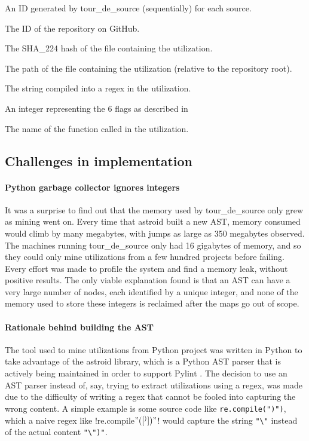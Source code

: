 \begin{description} \itemsep -1pt
\item[uniqueSourceID] An ID generated by tour\_de\_source (sequentially) for each source.
\item[repoID] The ID of the repository on GitHub.
\item[sourceJSON] 
\item[fileHash] The SHA\_224 hash of the file containing the utilization.
\item[filePath] The path of the file containing the utilization (relative to the repository root).
\item[pattern] The string compiled into a regex in the utilization.
\item[flags] An integer representing the 6 flags as described in 
\item[regexFunction] The name of the function called in the utilization.
\end{description}

\subsection{Challenges in implementation}
\label{sec:miningChallenges}

\paragraph{Python garbage collector ignores integers}  It was a surprise to find out that the memory used by tour\_de\_source only grew as mining went on.  Every time that astroid built a new AST, memory consumed would climb by many megabytes, with jumps as large as 350 megabytes observed.  The machines running tour\_de\_source only had 16 gigabytes of memory, and so they could only mine utilizations from a few hundred projects before failing.  Every effort was made to profile the system and find a memory leak, without positive results.  The only viable explanation found is that an AST can have a very large number of nodes, each identified by a unique integer, and none of the memory used to store these integers is reclaimed after the maps go out of scope.

\paragraph{Rationale behind building the AST} The tool used to mine utilizations from Python project was written in Python to take advantage of the astroid  library, which is a Python AST parser that is actively being maintained in order to support Pylint .  The decision to use an AST parser instead of, say, trying to extract utilizations using a regex, was made due to the difficulty of writing a regex that cannot be fooled into capturing the wrong content.  A simple example is some source code like {\tt re.compile("\")")}, which a naive regex like \cverb!re.compile\("([^)])"\)! would capture the string \verb!"\"! instead of the actual content \verb!"\")"!.

